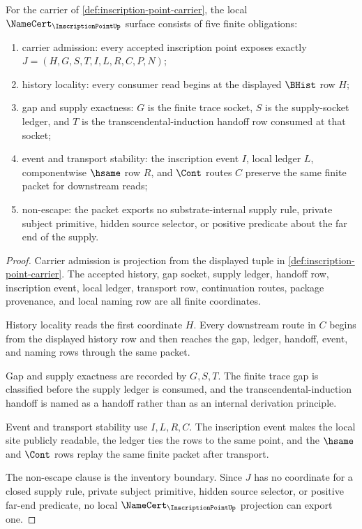 \begin{theorem}
\label{thm:inscription-point-namecert-obligations}
For the carrier of \autoref{def:inscription-point-carrier}, the local $\NameCert_{\InscriptionPointUp}$ surface consists of five finite obligations:
\begin{enumerate}
\item carrier admission: every accepted inscription point exposes exactly $J=(H,G,S,T,I,L,R,C,P,N)$;
\item history locality: every consumer read begins at the displayed $\BHist$ row $H$;
\item gap and supply exactness: $G$ is the finite trace socket, $S$ is the supply-socket ledger, and $T$ is the transcendental-induction handoff row consumed at that socket;
\item event and transport stability: the inscription event $I$, local ledger $L$, componentwise $\hsame$ row $R$, and $\Cont$ routes $C$ preserve the same finite packet for downstream reads;
\item non-escape: the packet exports no substrate-internal supply rule, private subject primitive, hidden source selector, or positive predicate about the far end of the supply.
\end{enumerate}
\end{theorem}
\begin{proof}
Carrier admission is projection from the displayed tuple in \autoref{def:inscription-point-carrier}. The accepted history, gap socket, supply ledger, handoff row, inscription event, local ledger, transport row, continuation routes, package provenance, and local naming row are all finite coordinates.

History locality reads the first coordinate $H$. Every downstream route in $C$ begins from the displayed history row and then reaches the gap, ledger, handoff, event, and naming rows through the same packet.

Gap and supply exactness are recorded by $G,S,T$. The finite trace gap is classified before the supply ledger is consumed, and the transcendental-induction handoff is named as a handoff rather than as an internal derivation principle.

Event and transport stability use $I,L,R,C$. The inscription event makes the local site publicly readable, the ledger ties the rows to the same point, and the $\hsame$ and $\Cont$ rows replay the same finite packet after transport.

The non-escape clause is the inventory boundary. Since $J$ has no coordinate for a closed supply rule, private subject primitive, hidden source selector, or positive far-end predicate, no local $\NameCert_{\InscriptionPointUp}$ projection can export one.
\end{proof}

